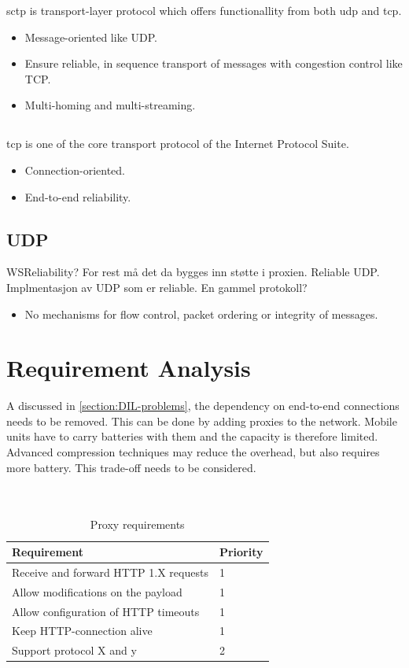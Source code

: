\documentclass[USenglish]{ifimaster}
\begin{document}
\gls{sctp} is transport-layer protocol which offers functionallity from both \gls{udp} and \gls{tcp}.
\begin{itemize}
    \item Message-oriented like UDP.
    \item Ensure reliable, in sequence transport of messages with congestion control like TCP.
    \item Multi-homing and multi-streaming.
\end{itemize}


\subsection{}
\gls{tcp} is one of the core transport protocol of the Internet Protocol Suite.
\begin{itemize}
    \item Connection-oriented.
    \item End-to-end reliability.
\end{itemize}

\subsection{UDP}
WSReliability? For rest må det da bygges inn støtte i proxien.
Reliable UDP. Implmentasjon av UDP som er reliable. En gammel protokoll?
\begin{itemize}
    \item No mechanisms for flow control, packet ordering or integrity of
    messages.
\end{itemize}

\section{Requirement Analysis}
A discussed in \cref{section:DIL-problems}, the dependency on end-to-end
connections needs to be removed. This can be done by adding proxies to the
network. Mobile units have to carry batteries with them and the capacity is
therefore limited. Advanced compression techniques may reduce the overhead, but
also requires more battery. This trade-off needs to be considered.
\\ \\ \\
\begin{table}[h]
\begin{tabular}{| l | l |}
\hline
  \textbf{Requirement} & \textbf{Priority} \\ \hline
  Receive and forward HTTP 1.X requests & 1\\ \hline
  Allow modifications on the payload & 1 \\ \hline
  Allow configuration of HTTP timeouts & 1 \\ \hline
  Keep HTTP-connection alive & 1 \\ \hline
  Support protocol X and y & 2 \\ \hline
\end{tabular}
\caption{Proxy requirements}
\end{table}
\end{document}

